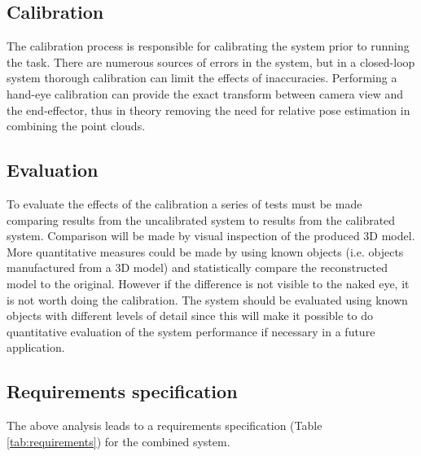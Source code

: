 \subsection{Calibration}
The calibration process is responsible for calibrating the system prior to running the task. There are numerous sources of errors in the system, but in a closed-loop system thorough calibration can limit the effects of inaccuracies. Performing a hand-eye calibration can provide the exact transform between camera view and the end-effector, thus in theory removing the need for relative pose estimation in combining the point clouds.

\subsection{Evaluation}
To evaluate the effects of the calibration a series of tests must be made comparing results from the uncalibrated system to results from the calibrated system. Comparison will be made by visual inspection of the produced 3D model. More quantitative measures could be made by using known objects (i.e. objects manufactured from a 3D model) and statistically compare the reconstructed model to the original. However if the difference is not visible to the naked eye, it is not worth doing the calibration. The system should be evaluated using known objects with different levels of detail since this will make it possible to do quantitative evaluation of the system performance if necessary in a future application.

\subsection{Requirements specification}
The above analysis leads to a requirements specification (Table \ref{tab:requirements}) for the combined system.

